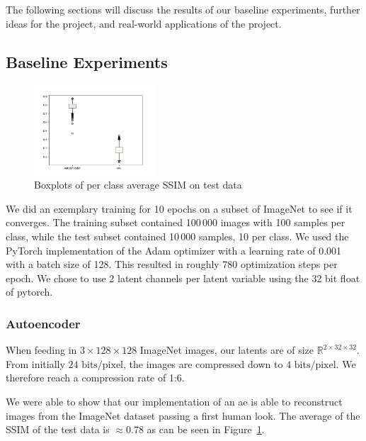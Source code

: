 The following sections will discuss the results of our baseline experiments, further ideas for the project, and real-world applications of the project.

\subsection{Baseline Experiments}\label{subsec:baseline-results}
\begin{figure}
    \centering
    \includegraphics[width=0.4\textwidth]{../../sample_images/evaluation/boxplot_ae_and_vae}
    \vspace{-10pt}
    \caption{Boxplots of per class average SSIM on test data}
    \label{fig:boxplots}
\end{figure}

We did an exemplary training for 10 epochs on a subset of ImageNet to see if it converges.
The training subset contained 100\,000 images with 100 samples per class, while the test subset contained 10\,000
samples, 10 per class.
We used the PyTorch implementation of the Adam optimizer with a learning rate of 0.001 with a batch size of 128.
This resulted in roughly 780 optimization steps per epoch.
We chose to use 2 latent channels per latent variable using the 32 bit float of pytorch.

\subsubsection{Autoencoder}\label{subsubsec:autoencoder}
When feeding in $3 \times 128 \times 128$ ImageNet images, our latents are of size $\mathbb{R}^{2\times 32 \times 32}$.
From initially $24\text{ bits/pixel}$, the images are compressed down to $4\text{ bits/pixel}$.
We therefore reach a compression rate of 1:6.

We were able to show that our implementation of an \ac{ae} is able to reconstruct images from the ImageNet dataset
passing a first human look.
The average of the SSIM of the test data is $\approx 0.78$ as can be seen in Figure~\ref{fig:boxplots}.


